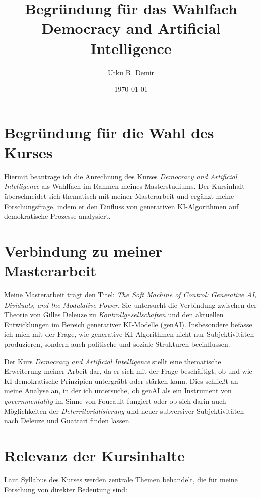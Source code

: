 \documentclass[a4paper,11pt]{article}
\title{Begründung für das Wahlfach \\ Democracy and Artificial Intelligence}
\author{Utku B. Demir}
\date{\today}
\begin{document}
\maketitle

\section{Begründung für die Wahl des Kurses}

Hiermit beantrage ich die Anrechnung des Kurses \textit{Democracy and Artificial Intelligence} als Wahlfach im Rahmen meines Masterstudiums. Der Kursinhalt überschneidet sich thematisch mit meiner Masterarbeit und ergänzt meine Forschungsfrage, indem er den Einfluss von generativen KI-Algorithmen auf demokratische Prozesse analysiert.

\section{Verbindung zu meiner Masterarbeit}

Meine Masterarbeit trägt den Titel: \textit{The Soft Machine of Control: Generative AI, Dividuals, and the Modulative Power}. Sie untersucht die Verbindung zwischen der Theorie von Gilles Deleuze zu \textit{Kontrollgesellschaften} und den aktuellen Entwicklungen im Bereich generativer KI-Modelle (genAI). Insbesondere befasse ich mich mit der Frage, wie generative KI-Algorithmen nicht nur Subjektivitäten produzieren, sondern auch politische und soziale Strukturen beeinflussen.

Der Kurs \textit{Democracy and Artificial Intelligence} stellt eine thematische Erweiterung meiner Arbeit dar, da er sich mit der Frage beschäftigt, ob und wie KI demokratische Prinzipien untergräbt oder stärken kann. Dies schließt an meine Analyse an, in der ich untersuche, ob genAI als ein Instrument von \textit{governmentality} im Sinne von Foucault fungiert oder ob sich darin auch Möglichkeiten der \textit{Deterritorialisierung} und neuer subversiver Subjektivitäten nach Deleuze und Guattari finden lassen.

\section{Relevanz der Kursinhalte}

Laut Syllabus des Kurses werden zentrale Themen behandelt, die für meine Forschung von direkter Bedeutung sind:
\end{document}
